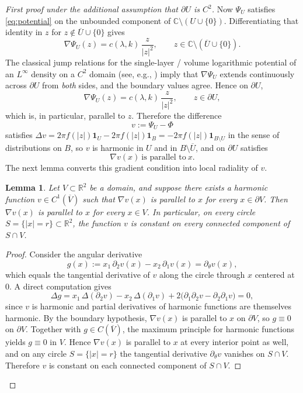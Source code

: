 \documentclass[a4paper,11pt,reqno]{amsart}
\numberwithin{equation}{section}
\theoremstyle{plain} %
\newtheorem{lemma}{Lemma}[section]
\theoremstyle{definition} %
\theoremstyle{remark}
\newcommand{\R}{\mathbb{R}}
\newcommand{\C}{\mathbb{C}}
\begin{document}
\begin{proof}[First proof under the additional assumption that $\partial U$ is $C^2$]
Now $\Psi_U$ satisfies \eqref{eq:potential} on the unbounded
component of $\C\setminus(U\cup\{0\})$. Differentiating that identity
in $z$ for $z\not\in \overline{U}\cup\{0\}$ gives
\[
\nabla \Psi_U(z)=c(\lambda,k)\,\frac{z}{|z|^2},
\qquad z\in \C\setminus(\overline{U}\cup\{0\}).
\]
The classical jump relations for the single-layer / volume logarithmic
potential of an $L^\infty$ density on a $C^2$ domain (see, e.g.,
\cite{Gustafsson}) imply that $\nabla\Psi_U$ extends continuously
across $\partial U$ from \emph{both} sides, and the boundary values
agree. Hence on $\partial U$,
\[
\nabla \Psi_U(z)=c(\lambda,k)\,\frac{z}{|z|^2},
\qquad z\in \partial U,
\]
which is, in particular, parallel to $z$. Therefore the difference
\[
v:=\Psi_U-\Phi
\]
satisfies $\Delta v=2\pi f(|z|)\mathbf 1_U-2\pi f(|z|)\mathbf 1_B
=-2\pi f(|z|)\mathbf 1_{B\setminus U}$ in the sense of distributions
on $B$, so $v$ is harmonic in $U$ and in $B\setminus\overline{U}$, and
on $\partial U$ satisfies
\[
\nabla v(x)\ \text{is parallel to}\ x.
\]
The next lemma converts this gradient condition into local radiality of $v$.

\begin{lemma}\label{lem:harmonic-locally-radial}
Let $V\subset \R^2$ be a domain, and suppose there exists a harmonic
function $v\in C^1(\overline{V})$ such that $\nabla v(x)$ is parallel to
$x$ for every $x\in \partial V$. Then $\nabla v(x)$ is parallel to $x$
for every $x\in V$. In particular, on every circle
$S=\{|x|=r\}\subset \R^2$, the function $v$ is constant on every
connected component of $S\cap V$.
\end{lemma}

\begin{proof}
Consider the angular derivative
\[
g(x):=x_1\,\partial_2 v(x)-x_2\,\partial_1 v(x)
=\partial_\theta v(x),
\]
which equals the tangential derivative of $v$ along the circle
through $x$ centered at $0$. A direct computation gives
\[
\Delta g
=x_1\,\Delta(\partial_2 v)-x_2\,\Delta(\partial_1 v)
+2\big(\partial_1\partial_2 v-\partial_2\partial_1 v\big)
=0,
\]
since $v$ is harmonic and partial derivatives of harmonic functions
are themselves harmonic. By the boundary hypothesis, $\nabla v(x)$ is
parallel to $x$ on $\partial V$, so $g\equiv 0$ on $\partial V$.
Together with $g\in C(\overline{V})$, the maximum principle for
harmonic functions yields $g\equiv 0$ in $V$. Hence $\nabla v(x)$ is
parallel to $x$ at every interior point as well, and on any circle
$S=\{|x|=r\}$ the tangential derivative $\partial_\theta v$ vanishes
on $S\cap V$. Therefore $v$ is constant on each connected component
of $S\cap V$.
\end{proof}


\end{proof}
\end{document}
